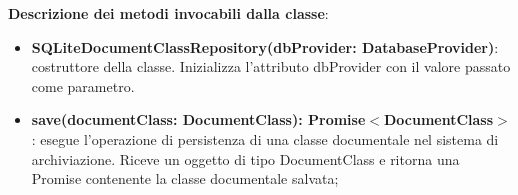 \documentclass[a4paper,12pt]{article}
\begin{document}
{{{              \noindent \textbf{Descrizione dei metodi invocabili dalla classe}:
                \begin{itemize}
                    \item \textbf{SQLiteDocumentClassRepository(dbProvider: DatabaseProvider)}: costruttore della classe. Inizializza l'attributo dbProvider con il valore passato come parametro.
                    \item \textbf{save(documentClass: DocumentClass): Promise$<$DocumentClass$>$}: esegue l'operazione di persistenza di una classe documentale nel sistema di archiviazione. Riceve un oggetto di tipo DocumentClass e ritorna una Promise contenente la classe documentale salvata;
                \end{itemize}

}}}
\end{document}
